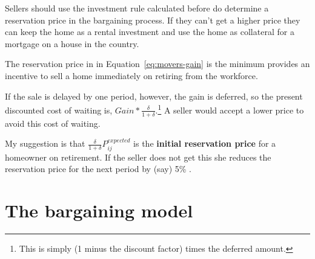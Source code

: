 {{Sellers should use the investment rule calculated before  do determine a  reservation price in the bargaining process. If they can't get a higher price they  can keep the home as a rental  investment and use the home as collateral for a mortgage on a house in the country.

The reservation price in in Equation~\ref {eq:movers-gain} is the minimum provides an incentive to sell a home immediately on retiring from the workforce. 



If the sale is delayed by one period, however, the gain is deferred, so the present discounted cost of waiting is, $Gain*\frac{\delta}{1+\delta}$.\footnote{This is simply (1 minus the discount factor) times the deferred amount.} A seller would accept a lower price to avoid this cost of waiting. 

My suggestion is that $\frac{\delta}{1+\delta}P_{ij}^{expected}$ is the \textbf{initial reservation price} for a homeowner on retirement. If the seller does not get this she reduces the reservation price for the next period by (say) 5\% .


}
}



\section{The bargaining model} \label{sec_model_bargaining}

